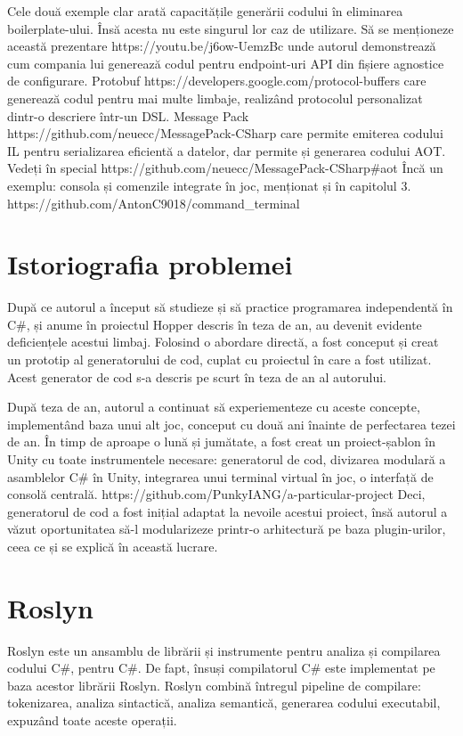 \documentclass{report}
\begin{document}
Cele două exemple clar arată capacitățile generării codului în eliminarea boilerplate-ului.
Însă acesta nu este singurul lor caz de utilizare.
Să se menționeze această prezentare https://youtu.be/j6ow-UemzBc unde autorul demonstrează cum compania lui generează codul pentru endpoint-uri API din fișiere agnostice de configurare.
Protobuf https://developers.google.com/protocol-buffers care generează codul pentru mai multe limbaje, realizând protocolul personalizat dintr-o descriere într-un DSL.
Message Pack https://github.com/neuecc/MessagePack-CSharp care permite emiterea codului IL pentru serializarea eficientă a datelor, dar permite și generarea codului AOT. Vedeți în special https://github.com/neuecc/MessagePack-CSharp#aot 
Încă un exemplu: consola și comenzile integrate în joc, menționat și în capitolul 3. https://github.com/AntonC9018/command_terminal


\section{Istoriografia problemei}

După ce autorul a început să studieze și să practice programarea independentă în C#, și anume în proiectul Hopper descris în teza de an, au devenit evidente deficiențele acestui limbaj.
Folosind o abordare directă, a fost conceput și creat un prototip al generatorului de cod, cuplat cu proiectul în care a fost utilizat.
Acest generator de cod s-a descris pe scurt în teza de an al autorului.

După teza de an, autorul a continuat să experiementeze cu aceste concepte, implementând baza unui alt joc, conceput cu două ani înainte de perfectarea tezei de an.
În timp de aproape o lună și jumătate, a fost creat un proiect-șablon în Unity cu toate instrumentele necesare: generatorul de cod, divizarea modulară a asamblelor C# în Unity, integrarea unui terminal virtual în joc, o interfață de consolă centrală.
https://github.com/PunkyIANG/a-particular-project
Deci, generatorul de cod a fost inițial adaptat la nevoile acestui proiect, însă autorul a văzut oportunitatea să-l modularizeze printr-o arhitectură pe baza plugin-urilor, ceea ce și se explică în această lucrare.

\section{Roslyn}


Roslyn este un ansamblu de librării și instrumente pentru analiza și compilarea codului C#, pentru C#.
De fapt, însuși compilatorul C# este implementat pe baza acestor librării Roslyn.
Roslyn combină întregul pipeline de compilare: tokenizarea, analiza sintactică, analiza semantică, generarea codului executabil, expuzând toate aceste operații.
\end{document}
